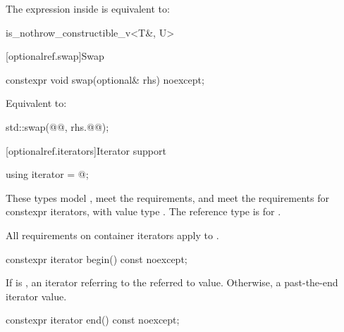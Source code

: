 \begin{addedblock}
\begin{itemdescr}
  \pnum
  \remarks
  The expression inside  is equivalent to:
  \begin{codeblock}
is_nothrow_constructible_v<T&, U>
  \end{codeblock}
\end{itemdescr}


[optionalref.swap]{Swap}

\begin{itemdecl}
constexpr void swap(optional& rhs) noexcept;
\end{itemdecl}

\begin{itemdescr}
  \pnum
  \effects
  Equivalent to:
  \begin{codeblock}
std::swap(@@, rhs.@@);
  \end{codeblock}
\end{itemdescr}


[optionalref.iterators]{Iterator support}
\begin{itemdecl}
using iterator = @\impdef@;
\end{itemdecl}

\begin{itemdescr}
\pnum
These types
model ,
meet the  requirements, and
meet the requirements for constexpr iterators,
with value type .
The reference type is  for .

\pnum
All requirements on container iterators apply to
.

\end{itemdescr}


\begin{itemdecl}
constexpr iterator begin() const noexcept;
\end{itemdecl}

\begin{itemdescr}
  \pnum
  \returns
  If  is ,
  an iterator referring to the referred to value.
  Otherwise, a past-the-end iterator value.

\end{itemdescr}

\begin{itemdecl}
constexpr iterator end() const noexcept;
\end{itemdecl}


\end{addedblock}
